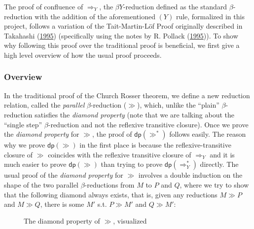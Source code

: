 \documentclass[a4paper, 12pt, twoside]{style/ociamthesis}
\theoremstyle{plain}
\theoremstyle{definition}
\theoremstyle{remark}
\newcommand{\red}{\Rightarrow_Y}
\newcommand{\dip}{\textsf{dp}}
\begin{document}
The proof of confluence of \(\red\), the \(\beta Y\)-reduction defined
as the standard \(\beta\)-reduction with the addition of the
aforementioned \((Y)\) rule, formalized in this project, follows a
variation of the Tait-Martin-Löf Proof originally described in Takahashi
(\protect\hyperlink{ref-takahashi95}{1995}) (specifically using the
notes by R. Pollack (\protect\hyperlink{ref-pollack95}{1995})). To show
why following this proof over the traditional proof is beneficial, we
first give a high level overview of how the usual proof proceeds.

\subsubsection{Overview}\label{overview}

In the traditional proof of the Church Rosser theorem, we define a new
reduction relation, called the \emph{parallel} \(\beta\)-reduction
(\(\gg\)), which, unlike the ``plain'' \(\beta\)-reduction satisfies the
\emph{diamond property} (note that we are talking about the ``single
step'' \(\beta\)-reduction and not the reflexive transitive closure).
Once we prove the \emph{diamond property} for \(\gg\), the proof of
\(\dip(\gg^*)\) follows easily. The reason why we prove \(\dip(\gg)\) in
the first place is because the reflexive-transitive closure of \(\gg\)
coincides with the reflexive transitive closure of \(\red\) and it is
much easier to prove \(\dip(\gg)\) than trying to prove \(\dip(\red^*)\)
directly. The usual proof of the \emph{diamond property} for \(\gg\)
involves a double induction on the shape of the two parallel
\(\beta\)-reductions from \(M\) to \(P\) and \(Q\), where we try to show
that the following diamond always exists, that is, given any reductions
\(M \gg P\) and \(M \gg Q\), there is some \(M'\) s.t. \(P \gg M'\) and
\(Q \gg M'\):

\begin{figure}[h]
\begin{center}
\end{center}
\caption{The diamond property of $\gg$, visualized}
\end{figure}
\end{document}
